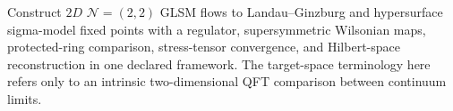\begin{openproblem}
\label{op:two-dimensional-susy-rg-construction}
Construct \(2D\) \(\mathcal N=(2,2)\) GLSM flows to Landau--Ginzburg and
hypersurface sigma-model fixed points with a regulator, supersymmetric
Wilsonian maps, protected-ring comparison, stress-tensor convergence, and
Hilbert-space reconstruction in one declared framework.  The target-space
terminology here refers only to an intrinsic two-dimensional QFT comparison
between continuum limits.
\end{openproblem}
